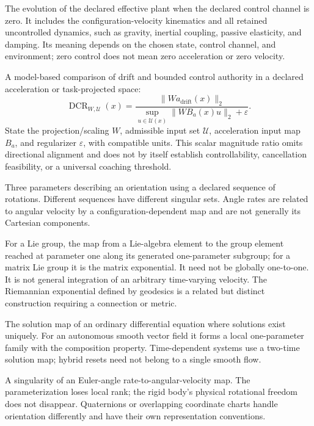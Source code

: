 \begin{description}[style=nextline,leftmargin=0pt,font=\bfseries,itemsep=0.5em]
\item[Drift]
The evolution of the declared effective plant when the declared control channel is zero. It includes the configuration-velocity kinematics and all retained uncontrolled dynamics, such as gravity, inertial coupling, passive elasticity, and damping. Its meaning depends on the chosen state, control channel, and environment; zero control does not mean zero acceleration or zero velocity.

\item[Drift-Control Ratio (DCR)]
A model-based comparison of drift and bounded control authority in a declared acceleration or task-projected space:
\begin{equation*}
\operatorname{DCR}_{W,\mathcal U}(x)=
\frac{\|W a_{\mathrm{drift}}(x)\|_2}
{\sup_{u\in\mathcal U(x)}\|W B_a(x)u\|_2+\varepsilon} .
\end{equation*}
State the projection/scaling $W$, admissible input set $\mathcal U$, acceleration input map $B_a$, and regularizer $\varepsilon$, with compatible units. This scalar magnitude ratio omits directional alignment and does not by itself establish controllability, cancellation feasibility, or a universal coaching threshold.

\item[Euler Angles]
Three parameters describing an orientation using a declared sequence of rotations. Different sequences have different singular sets. Angle rates are related to angular velocity by a configuration-dependent map and are not generally its Cartesian components.

\item[Exponential Map]
For a Lie group, the map from a Lie-algebra element to the group element reached at parameter one along its generated one-parameter subgroup; for a matrix Lie group it is the matrix exponential. It need not be globally one-to-one. It is not general integration of an arbitrary time-varying velocity. The Riemannian exponential defined by geodesics is a related but distinct construction requiring a connection or metric.

\item[Flow]
The solution map of an ordinary differential equation where solutions exist uniquely. For an autonomous smooth vector field it forms a local one-parameter family with the composition property. Time-dependent systems use a two-time solution map; hybrid resets need not belong to a single smooth flow.

\item[Gimbal Lock]
A singularity of an Euler-angle rate-to-angular-velocity map. The parameterization loses local rank; the rigid body's physical rotational freedom does not disappear. Quaternions or overlapping coordinate charts handle orientation differently and have their own representation conventions.


\end{description}
